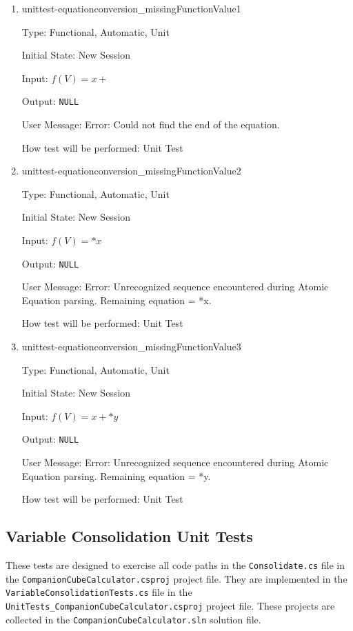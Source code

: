\documentclass[12pt, titlepage]{article}
\begin{document}
\begin{enumerate}
	\item{unittest-equationconversion\_missingFunctionValue1}
	
	Type: Functional, Automatic, Unit
	
	Initial State: New Session
	
	Input: $f(V) = x +$
	
	Output: \texttt{NULL}
	
	User Message: Error: Could not find the end of the equation. 
	
	How test will be performed: Unit Test\\
	
	\item{unittest-equationconversion\_missingFunctionValue2}
	
	Type: Functional, Automatic, Unit
	
	Initial State: New Session
	
	Input: $f(V) = *x$
	
	Output:	\texttt{NULL}
	
	User Message: Error: Unrecognized sequence encountered during Atomic 
	Equation parsing. Remaining equation = *x.
	
	How test will be performed: Unit Test\\
	
	\item{unittest-equationconversion\_missingFunctionValue3}
	
	Type: Functional, Automatic, Unit
	
	Initial State: New Session
	
	Input: $f(V) = x + * y$
	
	Output:	\texttt{NULL}
	
	User Message: Error: Unrecognized sequence encountered during Atomic 
	Equation 
	parsing. Remaining equation = *y.
	
	How test will be performed: Unit Test\\
	
\end{enumerate}

\subsection{Variable Consolidation Unit Tests}
These tests are designed to exercise all code paths in the 
\texttt{Consolidate.cs} 
file in the \texttt{CompanionCubeCalculator.csproj} project file. They are 
implemented in the \texttt{VariableConsolidationTests.cs} file in the \\
\texttt{UnitTests\_CompanionCubeCalculator.csproj} project file. These projects 
are collected in the \texttt{CompanionCubeCalculator.sln} solution file.
\end{document}
